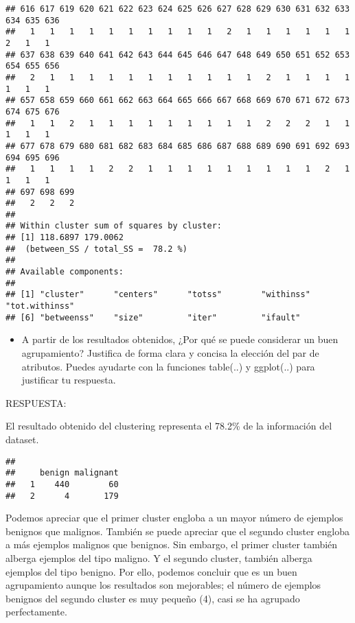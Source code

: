 \documentclass[]{article}
\newenvironment{Shaded}{\begin{snugshade}}{\end{snugshade}}
\newcommand{\KeywordTok}[1]{\textcolor[rgb]{0.13,0.29,0.53}{\textbf{#1}}}
\newcommand{\NormalTok}[1]{#1}
\newcommand{\OperatorTok}[1]{\textcolor[rgb]{0.81,0.36,0.00}{\textbf{#1}}}
\providecommand{\tightlist}{%
  \setlength{\itemsep}{0pt}\setlength{\parskip}{0pt}}
\begin{document}
\begin{verbatim}
## 616 617 619 620 621 622 623 624 625 626 627 628 629 630 631 632 633 634 635 636 
##   1   1   1   1   1   1   1   1   1   1   2   1   1   1   1   1   1   2   1   1 
## 637 638 639 640 641 642 643 644 645 646 647 648 649 650 651 652 653 654 655 656 
##   2   1   1   1   1   1   1   1   1   1   1   1   2   1   1   1   1   1   1   1 
## 657 658 659 660 661 662 663 664 665 666 667 668 669 670 671 672 673 674 675 676 
##   1   1   2   1   1   1   1   1   1   1   1   1   2   2   2   1   1   1   1   1 
## 677 678 679 680 681 682 683 684 685 686 687 688 689 690 691 692 693 694 695 696 
##   1   1   1   1   2   2   1   1   1   1   1   1   1   1   1   2   1   1   1   1 
## 697 698 699 
##   2   2   2 
## 
## Within cluster sum of squares by cluster:
## [1] 118.6897 179.0062
##  (between_SS / total_SS =  78.2 %)
## 
## Available components:
## 
## [1] "cluster"      "centers"      "totss"        "withinss"     "tot.withinss"
## [6] "betweenss"    "size"         "iter"         "ifault"
\end{verbatim}

\begin{itemize}
\tightlist
\item
  A partir de los resultados obtenidos, ¿Por qué se puede considerar un
  buen agrupamiento? Justifica de forma clara y concisa la elección del
  par de atributos. Puedes ayudarte con la funciones table(..) y
  ggplot(..) para justificar tu respuesta.
\end{itemize}

RESPUESTA:

El resultado obtenido del clustering representa el 78.2\% de la
información del dataset.

\begin{Shaded}
\end{Shaded}

\begin{verbatim}
##    
##     benign malignant
##   1    440        60
##   2      4       179
\end{verbatim}

Podemos apreciar que el primer cluster engloba a un mayor número de
ejemplos benignos que malignos. También se puede apreciar que el segundo
cluster engloba a más ejemplos malignos que benignos. Sin embargo, el
primer cluster también alberga ejemplos del tipo maligno. Y el segundo
cluster, también alberga ejemplos del tipo benigno. Por ello, podemos
concluir que es un buen agrupamiento aunque los resultados son
mejorables; el número de ejemplos benignos del segundo cluster es muy
pequeño (4), casi se ha agrupado perfectamente.
\end{document}
